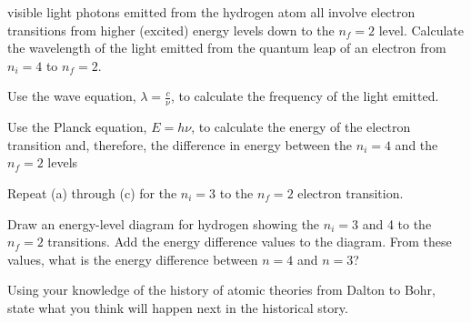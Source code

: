 \begin{problems}
\begin{enum-alph}
                visible light photons emitted from the hydrogen atom all involve electron
                transitions from higher (excited) energy levels down to the $n_f=2$ level. Calculate
                the wavelength of the light emitted from the quantum leap of an electron from
                $n_i=4$ to $n_f=2$.
            \item Use the wave equation, $\lambda=\frac{c}{\nu}$, to calculate the frequency of
                the light emitted.
            \item Use the Planck equation, $E=h\nu$, to calculate the energy of the electron
                transition and, therefore, the difference in energy between the $n_i=4$ and the $n_f=2$
                levels
            \item Repeat (a) through (c) for the $n_i=3$ to the $n_f=2$ electron transition.
            \item Draw an energy-level diagram for hydrogen showing the $n_i=3$ and 4
                to the $n_f=2$ transitions. Add the energy difference values to the diagram.
                From these values, what is the energy difference between $n=4$ and $n=3$?
        \end{enum-alph}
    \item Using your knowledge of the history of atomic theories from Dalton to Bohr, state what
        you think will happen next in the historical story.
\end{problems}
